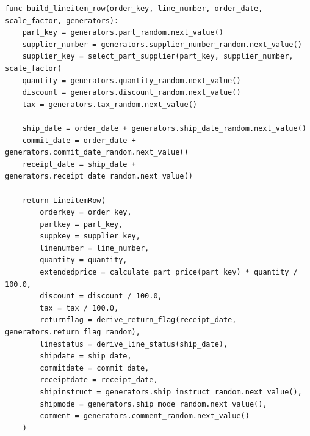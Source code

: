 \begin{lstlisting}[style=reportpseudocode,caption={Формирование строки lineitem},label={lst:app-lineitem-row}]
func build_lineitem_row(order_key, line_number, order_date, scale_factor, generators):
    part_key = generators.part_random.next_value()
    supplier_number = generators.supplier_number_random.next_value()
    supplier_key = select_part_supplier(part_key, supplier_number, scale_factor)
    quantity = generators.quantity_random.next_value()
    discount = generators.discount_random.next_value()
    tax = generators.tax_random.next_value()

    ship_date = order_date + generators.ship_date_random.next_value()
    commit_date = order_date + generators.commit_date_random.next_value()
    receipt_date = ship_date + generators.receipt_date_random.next_value()

    return LineitemRow(
        orderkey = order_key,
        partkey = part_key,
        suppkey = supplier_key,
        linenumber = line_number,
        quantity = quantity,
        extendedprice = calculate_part_price(part_key) * quantity / 100.0,
        discount = discount / 100.0,
        tax = tax / 100.0,
        returnflag = derive_return_flag(receipt_date, generators.return_flag_random),
        linestatus = derive_line_status(ship_date),
        shipdate = ship_date,
        commitdate = commit_date,
        receiptdate = receipt_date,
        shipinstruct = generators.ship_instruct_random.next_value(),
        shipmode = generators.ship_mode_random.next_value(),
        comment = generators.comment_random.next_value()
    )
\end{lstlisting}
